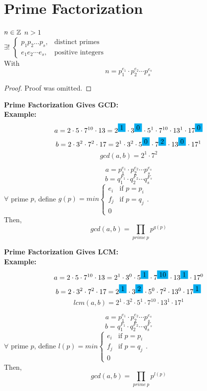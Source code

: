 \documentclass[openany]{report}
\begin{document}
\section{Prime Factorization}
\begin{theorem}\label{thm:primefactorization}
    $n \in \mathbb{Z}$ $n > 1$\\[1ex]
    $\exists!$ $\begin{cases}
        p_1 p_2 \dots p_s , &\text{distinct primes}\\
        e_1 e_2 \cdots e_s, &\text{positive integers}
    \end{cases}$ \\[1ex]
    With 
    $$n = p_1^{e_1} \cdot p_2^{e_2} \cdots p_s^{e_s}$$
\end{theorem}
\begin{proof}
    Proof was omitted.
\end{proof}
\noindent
\textbf{Prime Factorization Gives GCD:}\label{primefactorization:gcd}\\

\textbf{Example:} 
$$a = 2 \cdot 5 \cdot 7^{10} \cdot 13 = 2^{\hlblue{1}} \cdot 3^{\hlblue{0}} \cdot 5^1 \cdot 7^{10} \cdot 13^1 \cdot 17^{\hlblue{0}}$$
$$b = 2 \cdot 3^2 \cdot 7^2 \cdot 17 = 2^1 \cdot 3^2 \cdot 5^{\hlblue{0}} \cdot 7^{\hlblue{2}} \cdot 13^{\hlblue{0}} \cdot 17^1$$
$$gcd(a,b) = 2^1 \cdot 7^2$$

$$a = p_1^{e_1} \cdot p_2^{e_2} \cdots p_s^{e_s}$$
$$b = q_1^{F_1} \cdot q_2^{F_2} \cdots q_s^{F_s}$$
$\forall$ prime $p$, define $g(p) = min\begin{cases}
    e_i &\text{if $p = p_i$}\\
    f_j &\text{if $p = q_j$}\\
    0
\end{cases}$.\\
Then, 
$$gcd(a,b) = \prod_{prime \ p} p^{g(p)}$$ 

\noindent
\textbf{Prime Factorization Gives LCM:}\label{primefactorization:lcm}\\

\textbf{Example:} 
$$a = 2 \cdot 5 \cdot 7^{10} \cdot 13 = 2^1 \cdot 3^0 \cdot 5^{\hlblue{1}} \cdot 7^{\hlblue{10}} \cdot 13^{\hlblue{1}} \cdot 17^0$$
$$b = 2 \cdot 3^2 \cdot 7^2 \cdot 17 = 2^{\hlblue{1}} \cdot 3^{\hlblue{2}} \cdot 5^0 \cdot 7^2 \cdot 13^0 \cdot 17^{\hlblue{1}}$$
$$lcm(a,b) = 2^1 \cdot 3^2 \cdot 5^1 \cdot 7^{10} \cdot 13^1 \cdot 17^1$$

$$a = p_1^{e_1} \cdot p_2^{e_2} \cdots p_s^{e_s}$$
$$b = q_1^{F_1} \cdot q_2^{F_2} \cdots q_s^{F_s}$$
$\forall$ prime $p$, define $l(p) = min\begin{cases}
    e_i &\text{if $p = p_i$}\\
    f_j &\text{if $p = q_j$}\\
    0
\end{cases}$.\\
Then, 
$$gcd(a,b) = \prod_{prime \ p} p^{l(p)}$$ 
\end{document}
